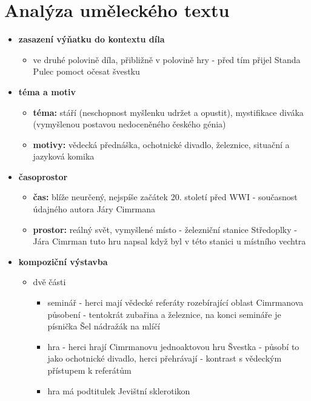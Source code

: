 \documentclass[11pt]{article}
\begin{document}
    \section*{Analýza uměleckého textu}
    \begin{itemize}
        \item\textbf{zasazení výňatku do kontextu díla}
        \begin{itemize}
            \item ve druhé polovině díla, přibližně v polovině hry - před tím přijel Standa Pulec pomoct očesat švestku
        \end{itemize}
        \item\textbf{téma a motiv}
        \begin{itemize}
            \item\textbf{téma: }stáří (neschopnost myšlenku udržet a opustit), mystifikace diváka (vymyšlenou postavou nedoceněného českého génia)
            \item\textbf{motivy: }vědecká přednáška, ochotnické divadlo, železnice, situační a jazyková komika
        \end{itemize}
        \item\textbf{časoprostor}
        \begin{itemize}
            \item\textbf{čas: }blíže neurčený, nejspíše začátek 20. století před WWI - současnost údajného autora Járy Cimrmana
            \item\textbf{prostor: }reálný svět, vymyšlené místo - železniční stanice Středoplky - Jára Cimrman tuto hru napsal když byl v této stanici u místního vechtra
        \end{itemize}
        \item\textbf{kompoziční výstavba}
        \begin{itemize}
            \item dvě části
            \begin{itemize}
                \item seminář - herci mají vědecké referáty rozebírající oblast Cimrmanova působení - tentokrát zubařina a železnice, na konci semináře je písnička Šel nádražák na mlíčí
                \item hra - herci hrají Cimrmanovu jednoaktovou hru Švestka - působí to jako ochotnické divadlo, herci přehrávají - kontrast s vědeckým přístupem k referátům
                \item hra má podtitulek Jevištní sklerotikon
            \end{itemize}

\end{itemize}
\end{itemize}
\end{document}
